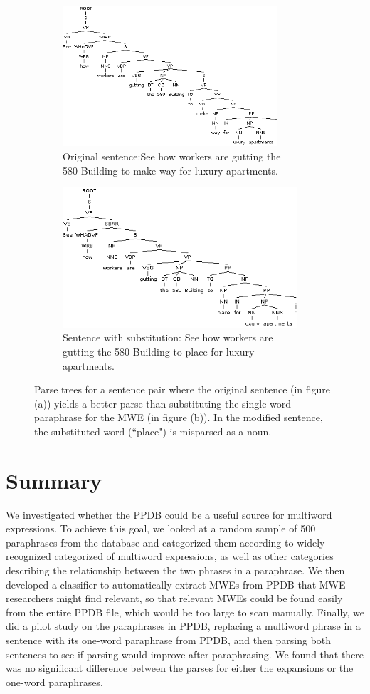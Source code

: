 \documentclass[11pt]{article}
\begin{document}
\begin{figure}
\centering
\begin{subfigure}{.5\textwidth}
  \centering
  \includegraphics[width=80mm]{figs/make_way_tree.png}
  \caption{Original sentence:See how workers are gutting the \\
 580 Building to make way for luxury apartments.}
  \label{fig:sub1}
\end{subfigure}%
\begin{subfigure}{.5\textwidth}
  \centering
  \includegraphics[width=87mm]{figs/place_tree.png}
  \caption{Sentence with substitution: See how workers are gutting the 580 Building to place for luxury apartments.}
  \label{fig:sub2}
\end{subfigure}
\caption{Parse trees for a sentence pair where the original sentence (in figure (a)) yields a better parse than substituting the single-word paraphrase for the MWE (in figure (b)). In the modified sentence, the substituted word (``place") is misparsed as a noun.}
\label{place}
\end{figure}

\section{Summary}
We investigated whether the PPDB could be a useful source for multiword expressions. To achieve this goal, we looked at a random sample of 500 paraphrases from the database and categorized them according to widely recognized categorized of multiword expressions, as well as other categories describing the relationship between the two phrases in a paraphrase. We then developed a classifier to automatically extract MWEs from PPDB that MWE researchers might find relevant, so that relevant MWEs could be found easily from the entire PPDB file, which would be too large to scan manually. Finally, we did a pilot study on the paraphrases in PPDB, replacing a multiword phrase in a sentence with its one-word paraphrase from PPDB, and then parsing both sentences to see if parsing would improve after paraphrasing. We found that there was no significant difference between the parses for either the expansions or the one-word paraphrases.
\end{document}
